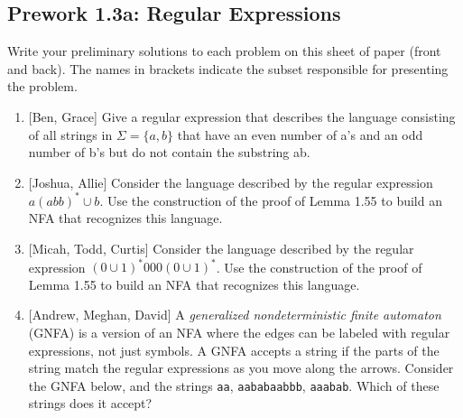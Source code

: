 \documentclass[
  twoside]{article}
\author{}
\date{\vspace{-2.5em}}
\begin{document}
\hypertarget{prework-1.3a-regular-expressions}{%
\subsection{Prework 1.3a: Regular
Expressions}\label{prework-1.3a-regular-expressions}}

Write your preliminary solutions to each problem on this sheet of paper
(front and back). The names in brackets indicate the subset responsible
for presenting the problem.

\begin{enumerate}
\def\labelenumi{\arabic{enumi}.}
\item
  {[}Ben, Grace{]} Give a regular expression that describes the language
  consisting of all strings in \(\Sigma = \{a,b\}\) that have an even
  number of a's and an odd number of b's but do not contain the
  substring ab.
\item
  {[}Joshua, Allie{]} Consider the language described by the regular
  expression \(a(abb)^*\cup b\). Use the construction of the proof of
  Lemma 1.55 to build an NFA that recognizes this language.
\item
  {[}Micah, Todd, Curtis{]} Consider the language described by the
  regular expression \((0\cup 1)^*000(0\cup 1)^*\). Use the construction
  of the proof of Lemma 1.55 to build an NFA that recognizes this
  language.
\item
  {[}Andrew, Meghan, David{]} A \emph{generalized nondeterministic
  finite automaton} (GNFA) is a version of an NFA where the edges can be
  labeled with regular expressions, not just symbols. A GNFA accepts a
  string if the parts of the string match the regular expressions as you
  move along the arrows. Consider the GNFA below, and the strings
  \texttt{aa}, \texttt{aababaabbb}, \texttt{aaabab}. Which of these
  strings does it accept?
\end{enumerate}
\end{document}
